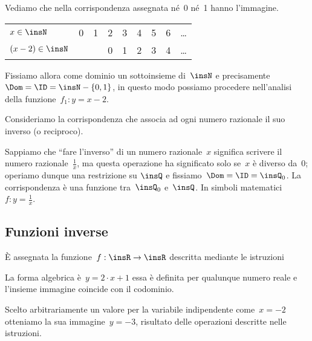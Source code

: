 \begin{exrig}
\begin{esempio}
Vediamo che nella corrispondenza assegnata né~0 né~1 hanno l'immagine.

\begin{center}
\begin{tabular}{l*8{c}}
\toprule
$x\in \insN$ & 0 & 1 & 2 & 3 & 4 & 5 & 6 & \ldots \\
$(x-2)\in \insN$ & & & 0 & 1 & 2 & 3 & 4 & \ldots \\
\bottomrule
\end{tabular}
\end{center}

Fissiamo allora come dominio un sottoinsieme di~$\insN$ e precisamente~$\Dom = 
\ID = \insN - \{0,1\}$,
in questo modo possiamo procedere nell'analisi della funzione~$f_{1}:y=x-2$.
\end{esempio}

 \begin{esempio}
 Consideriamo la corrispondenza che associa ad ogni numero razionale il suo 
inverso (o reciproco).

Sappiamo che ``fare l'inverso'' di un numero razionale~$x$
significa scrivere il numero razionale~$\frac{1}{x}$, ma questa
operazione ha significato solo se~$x$ è diverso da~0; operiamo dunque
una restrizione su $\insQ$ e fissiamo~$\Dom = \ID = \insQ_0$. La corrispondenza 
è una funzione tra~$\insQ_0$
e~$\insQ$. In simboli matematici~$f: y=\frac{1}{x}$.
 \end{esempio}
\end{exrig}



\subsection{Funzioni inverse}
\label{subsec:fun_inverse}

È assegnata la funzione~$f:\insR\rightarrow \insR$ descritta mediante le 
istruzioni
\begin{center}
 
\end{center}

La forma algebrica è~$y=2\cdot x+1$ essa è definita per qualunque
numero reale e l'insieme immagine coincide con il codominio.

Scelto arbitrariamente un valore per la variabile
indipendente come~$x=-2$ otteniamo la sua immagine~$y=-3$, risultato
delle operazioni descritte nelle istruzioni.

